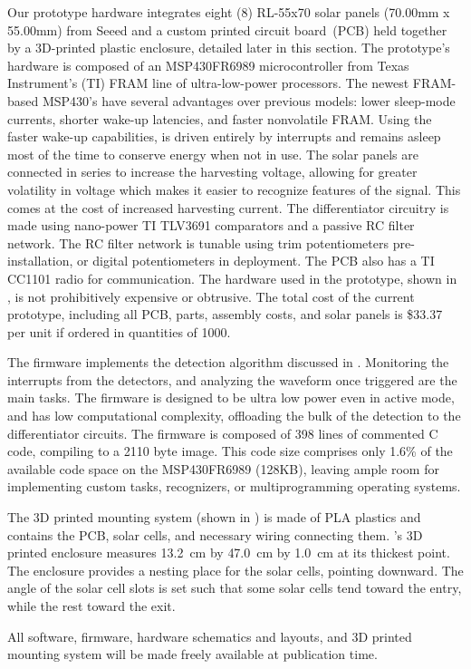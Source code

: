  Our prototype hardware integrates eight (8) RL-55x70 solar panels (70.00mm x 55.00mm) from Seeed and a custom printed circuit board~(PCB) held together by a 3D-printed plastic enclosure, detailed later in this section.
The prototype's hardware is composed of an MSP430FR6989 microcontroller from Texas Instrument's (TI) FRAM line of ultra-low-power processors.
The newest FRAM-based MSP430's have several advantages over previous models: lower sleep-mode currents, shorter wake-up latencies, and faster nonvolatile FRAM.
Using the faster wake-up capabilities, \sysname is driven entirely by interrupts and remains asleep most of the time to conserve energy when not in use.
The solar panels are connected in series to increase the harvesting voltage, allowing for greater volatility in voltage which makes it easier to recognize features of the signal. This comes at the cost of increased harvesting current.
The differentiator circuitry is made using nano-power TI TLV3691 comparators and a passive RC filter network. The RC filter network is tunable using trim potentiometers pre-installation, or digital potentiometers in deployment.
The \sysname PCB also has a TI CC1101 radio for communication.
The hardware used in the \sysname prototype, shown in , is not prohibitively expensive or obtrusive.
The total cost of the current prototype, including all PCB, parts, assembly costs, and solar panels is \$33.37 per unit if ordered in quantities of 1000.

The \sysname firmware implements the detection algorithm discussed in . Monitoring the interrupts from the detectors, and analyzing the waveform once triggered are the main tasks.
The firmware is designed to be ultra low power even in active mode, and has low computational complexity, offloading the bulk of the detection to the differentiator circuits.
The \sysname firmware is composed of 398 lines of commented C code, compiling to a 2110 byte image. This code size comprises only 1.6\% of the available code space on the MSP430FR6989 (128KB), leaving ample room for implementing custom tasks, recognizers, or multiprogramming operating systems.  

The 3D printed mounting system (shown in ) is made of PLA plastics and contains the PCB, solar cells, and necessary wiring connecting them.
\sysname's 3D printed enclosure measures \SI{13.2}{\centi\meter} by \SI{47.0}{\centi\meter} by \SI{1.0}{\centi\meter} at its thickest point. The enclosure provides a nesting place for the solar cells, pointing downward.
The angle of the solar cell slots is set such that some solar cells tend toward the entry, while the rest toward the exit.

All software, firmware, hardware schematics and layouts, and 3D printed mounting system will be made freely available at publication time.
